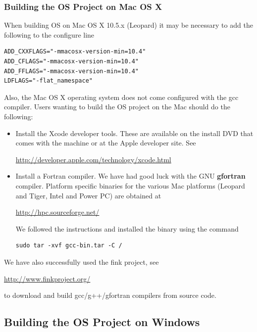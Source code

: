\documentclass[11pt]{article}
\renewcommand{\_}{{\char"5F}}
\renewcommand{\{}{{\char"7B}}
\renewcommand{\}}{{\char"7D}}
\renewcommand{\^}{{\char"0D}}
\renewcommand{\'}{{\char"0D}}
\begin{document}
\subsubsection{Building the OS Project on Mac OS X}\label{section:unixmacbuilds}

When building OS on Mac OS X 10.5.x (Leopard)   it may be necessary  to add the following to the configure line


\begin{verbatim}
ADD_CXXFLAGS="-mmacosx-version-min=10.4" 
ADD_CFLAGS="-mmacosx-version-min=10.4" 
ADD_FFLAGS="-mmacosx-version-min=10.4"
LDFLAGS="-flat_namespace"
\end{verbatim}

Also, the Mac OS X operating system does not come configured with the gcc compiler. Users wanting to build the OS project on the Mac should do the following:

\begin{itemize}
\item Install the Xcode developer tools.  These are available on the install DVD that comes with the machine or at the Apple developer site. See

\url{http://developer.apple.com/technology/xcode.html}

\item Install a Fortran compiler.  We have had good luck with the GNU {\bf gfortran} compiler. Platform specific binaries for the various Mac platforms (Leopard and Tiger, Intel and Power PC) are obtained at

\url{http://hpc.sourceforge.net/}

We followed the instructions and installed the binary using the command


\begin{verbatim}
sudo tar -xvf gcc-bin.tar -C /
\end{verbatim}

\end{itemize}

We have also successfully used the fink project, see

\url{http://www.finkproject.org/}

to download and build gcc/g++/gfortran compilers from source code. 


\subsection{Building the OS Project on Windows}\label{section:windowsinstall}
\end{document}
